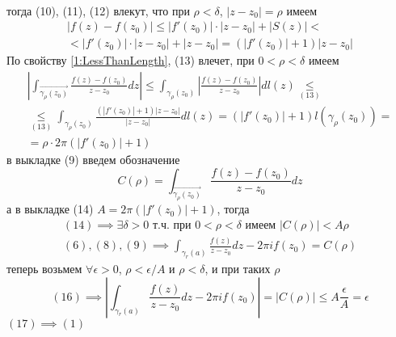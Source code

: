 \documentclass[main]{subfiles}
\begin{document}
\begin{longProof}[теоремы]
\begin{gather*}
    \end{gather*}
    тогда (10), (11), (12) влекут, что при $\rho < \delta$, $|z - z_0| = \rho$ имеем
    \begin{multline*}
        |f(z) - f(z_0)| \le |f'(z_0)| \cdot |z - z_0| + |S(z)| < \\
        < |f'(z_0)| \cdot  |z - z_0| + |z - z_0| = (|f'(z_0)| + 1)|z - z_0| \tag{13}
    \end{multline*}
    По свойству \ref{1:LessThanLength}, (13) влечет, при $0 < \rho < \delta$ имеем
    \begin{multline*}
        \left| \int_{\overrightarrow{\gamma_\rho(z_0)}} \frac{f(z) - f(z_0)}{z - z_0} dz \right| \le \int_{\gamma_\rho(z_0)} \left| \frac{f(z) - f(z_0)}{z - z_0} \right| dl(z) \underset{(13)}{\le} \\
        \underset{(13)}{\le} \int_{\gamma_\rho(z_0)} \frac{(|f'(z_0)| + 1) |z - z_0|}{|z - z_0|} dl(z)  = (|f'(z_0)| + 1) l(\gamma_\rho(z_0)) =\\
        = \rho \cdot 2 \pi (|f'(z_0)| + 1) \tag{14}
    \end{multline*}
    в выкладке (9) введем обозначение
    \[C (\rho) = \int_{\overrightarrow{\gamma_\rho(z_0)}} \frac{f(z) - f(z_0)}{z - z_0} dz\]
    а в выкладке (14) $A = 2 \pi (|f'(z_0)| + 1)$, тогда
    \begin{gather*}
        (14) \implies \exists \delta > 0 \text{ т.ч. при } 0 < \rho < \delta \text{ имеем } |C(\rho)| < A \rho \tag{15}  \\
        (6), (8), (9) \implies \int_{\gamma_r(a)} \frac{f(z)}{z - z_0} dz - 2 \pi i f(z_0) = C(\rho) \tag{16}
    \end{gather*}
    теперь возьмем $\forall \epsilon > 0$, $\rho < \epsilon / A$ и $\rho < \delta$, и при таких $\rho$
    \[(16) \implies \left| \int_{\gamma_r(a)} \frac{f(z)}{z - z_0} dz - 2 \pi i f(z_0) \right| = |C(\rho)| \le A \frac{\epsilon}{A} = \epsilon \tag{17}\]
    $(17) \implies (1)$
\end{longProof}
\end{document}
